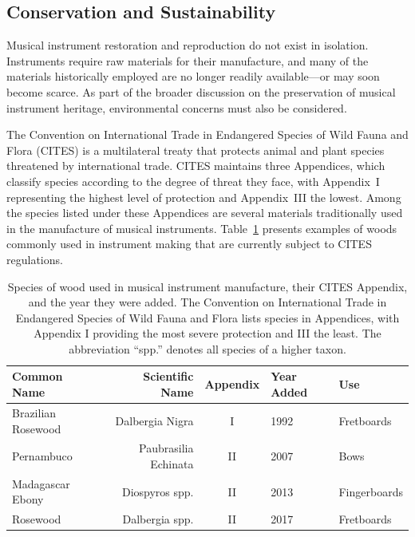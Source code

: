\subsection{Conservation and Sustainability}

Musical instrument restoration and reproduction do not exist in isolation.
Instruments require raw materials for their manufacture, and many of the
materials historically employed are no longer readily available---or may soon
become scarce. As part of the broader discussion on the preservation of musical
instrument heritage, environmental concerns must also be considered.

The Convention on International Trade in Endangered Species of Wild Fauna and
Flora (CITES) is a multilateral treaty that protects animal and plant species
threatened by international trade. CITES maintains three Appendices, which
classify species according to the degree of threat they face, with Appendix~I
representing the highest level of protection and Appendix~III the lowest. Among
the species listed under these Appendices are several materials traditionally
used in the manufacture of musical instruments. Table~\ref{tab:cites} presents
examples of woods commonly used in instrument making that are currently subject
to CITES regulations.



\begin{table}
	\centering
	\small
	\begin{tabular}{lrcll}
		\toprule
		\textbf{Common Name}          & \textbf{Scientific Name} & \textbf{Appendix} &
		\textbf{Year Added}           & \textbf{Use}                                   \\ \hline
		Brazilian Rosewood            & Dalbergia Nigra          & I                 &
		1992 \cite{cites_cop17_2017}  & Fretboards                                     \\
		Pernambuco                    & Paubrasilia Echinata     & II                &
		2007 \cite{cites_cop19_2019}  & Bows                                           \\
		Madagascar Ebony              & Diospyros spp.           & II                &
		2013 \cite{cites_timber_2023} & Fingerboards                                   \\
		Rosewood                      & Dalbergia spp.           & II                &
		2017 \cite{usda_species_2025} & Fretboards                                     \\
		\bottomrule
	\end{tabular}
	\caption[Species of wood and its use in musical instrument manufacture]{Species of wood used in musical instrument manufacture, their CITES Appendix, and the year they were added. The Convention on International Trade in Endangered Species of Wild Fauna and Flora lists species in Appendices, with Appendix I providing the most severe protection and III the least. The abbreviation ``spp.'' denotes all species of a higher taxon.}
	\label{tab:cites}
\end{table}


